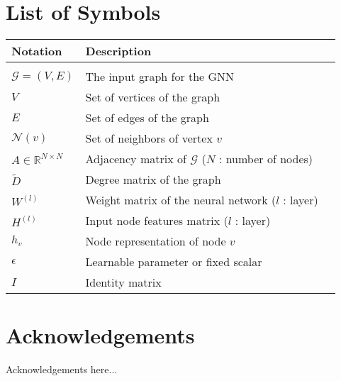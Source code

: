 \documentclass{Configuration_Files/PoliMi3i_thesis}
\begin{document}
    \chapter*{List of Symbols} %
    \begin{table}[H]
        \centering
        \begin{tabular}{lll}
            \textbf{Notation} & \textbf{Description} \\\hline\\[-9px]
            $\mathcal{G} = (V, E)$        & The input graph for the GNN  \\[2px]
            $V$ & Set of vertices of the graph \\[2px]
            $E$ & Set of edges of the graph \\[2px]
            $\mathcal{N}(v)$ & Set of neighbors of vertex $v$ \\[2px]
            $A \in \mathbb{R}^{N \times N}$        & Adjacency matrix of $\mathcal{G}$ ($N$ : number of nodes)  \\[2px]
            $\tilde{D}$ & Degree matrix of the graph \\[2px]
            $W^{(l)}$ & Weight matrix of the neural network ($l$ : layer) \\[2px]
            $H^{(l)}$ & Input node features matrix ($l$ : layer) \\[2px]
            $h_v$ & Node representation of node $v$ \\[2px]
            $\epsilon$ & Learnable parameter or fixed scalar \\[2px]
            $I$ & Identity matrix \\[2px]

        \end{tabular}\label{tab:symbols_table}
    \end{table}

    \chapter*{Acknowledgements}
    Acknowledgements here...

    \cleardoublepage
\end{document}
